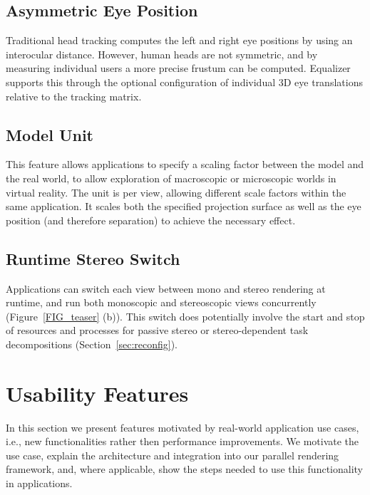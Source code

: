 \documentclass[10pt,journal,compsoc]{IEEEtran}
\newcommand{\sref}[1]{Section~\ref{#1}}
\newcommand{\fig}[1]{Figure~\ref{#1}}
\begin{document}
\subsection{Asymmetric Eye Position}

Traditional head tracking computes the left and right eye positions by using an
interocular distance. However, human heads are not symmetric, and by measuring
individual users a more precise frustum can be computed. \textsf{Equalizer}
supports this through the optional configuration of individual 3D eye
translations relative to the tracking matrix.

\subsection{Model Unit}

This feature allows applications to specify a scaling factor between the model
and the real world, to allow exploration of macroscopic or microscopic worlds in
virtual reality. The unit is per view, allowing different scale factors within
the same application. It scales both the specified projection surface as well
as the eye position (and therefore separation) to achieve the necessary effect.

\subsection{Runtime Stereo Switch}

Applications can switch each view between mono and stereo rendering at runtime,
and run both monoscopic and stereoscopic views concurrently (\fig{FIG_teaser}
(b)). This switch does potentially involve the start and stop of resources and
processes for passive stereo or stereo-dependent task decompositions
(\sref{sec:reconfig}).

\section{Usability Features}

In this section we present features motivated by real-world application use
cases, i.e., new functionalities rather then performance improvements. We
motivate the use case, explain the architecture and integration into our
parallel rendering framework, and, where applicable, show the steps needed to
use this functionality in applications.
\end{document}
